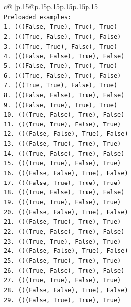 \documentclass{article}
\begin{document}
{\begin{supertabular}{c@{$\;$}|p{.15\linewidth}@{}p{.15\linewidth}p{.15\linewidth}p{.15\linewidth}p{.15\linewidth}p{.15\linewidth}}
{{{\\ 
\texttt{Preloaded examples:} \\
\texttt{1. (((False, True), True), True)} \\
\texttt{2. (((True, False), True), False)} \\
\texttt{3. (((True, True), False), True)} \\
\texttt{4. (((False, False), True), False)} \\
\texttt{5. (((False, True), True), True)} \\
\texttt{6. (((True, False), True), False)} \\
\texttt{7. (((True, True), False), True)} \\
\texttt{8. (((False, False), True), False)} \\
\texttt{9. (((False, True), True), True)} \\
\texttt{10. (((True, False), True), False)} \\
\texttt{11. (((True, True), False), True)} \\
\texttt{12. (((False, False), True), False)} \\
\texttt{13. (((False, True), True), True)} \\
\texttt{14. (((True, False), True), False)} \\
\texttt{15. (((True, True), False), True)} \\
\texttt{16. (((False, False), True), False)} \\
\texttt{17. (((False, True), True), True)} \\
\texttt{18. (((True, False), True), False)} \\
\texttt{19. (((True, True), False), True)} \\
\texttt{20. (((False, False), True), False)} \\
\texttt{21. (((False, True), True), True)} \\
\texttt{22. (((True, False), True), False)} \\
\texttt{23. (((True, True), False), True)} \\
\texttt{24. (((False, False), True), False)} \\
\texttt{25. (((False, True), True), True)} \\
\texttt{26. (((True, False), True), False)} \\
\texttt{27. (((True, True), False), True)} \\
\texttt{28. (((False, False), True), False)} \\
\texttt{29. (((False, True), True), True)} \\
}}}
\end{supertabular}}
\end{document}
